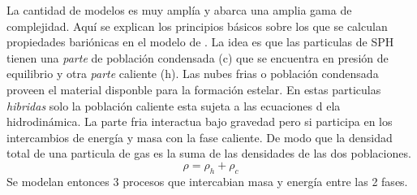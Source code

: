 La cantidad de modelos es muy ampl\'ia y abarca una amplia gama de complejidad. Aqu\'i se explican los principios b\'asicos sobre los que se calculan propiedades bari\'onicas en el modelo de \citet{Springel2003}.
La idea es que las particulas de SPH tienen una \textit{parte} de poblaci\'on condensada (c) que se encuentra en presi\'on de equilibrio y otra \textit{parte} caliente (h). Las nubes frias o poblaci\'on condensada proveen el material disponble para la formaci\'on estelar. En estas particulas \textit{hibridas} solo la poblaci\'on caliente esta sujeta a las ecuaciones d ela hidrodin\'amica. La parte fria interactua bajo gravedad pero si participa en los intercambios de energ\'ia y masa con la fase caliente. De modo que la densidad total de una particula de gas es la suma de las densidades de las dos poblaciones. 
\begin{equation}
    \rho = \rho_{h} + \rho_{c}
\end{equation}{}
Se modelan entonces 3 procesos que intercabian masa y energ\'ia entre las 2 fases.
